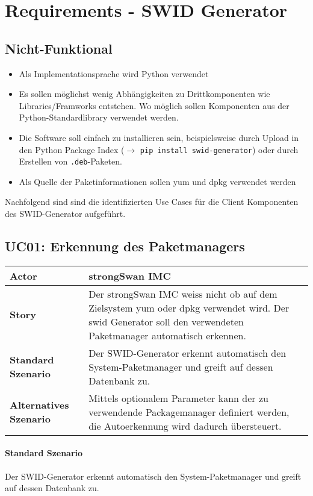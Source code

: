 \section{Requirements - SWID Generator}

\subsection{Nicht-Funktional}

\begin{itemize}
    \item Als Implementationsprache wird Python verwendet
    \item Es sollen möglichst wenig Abhängigkeiten zu Drittkomponenten wie
			Libraries/Framworks entstehen. Wo möglich sollen Komponenten aus der
			Python-Standardlibrary verwendet werden.
    \item Die Software soll einfach zu installieren sein, beispielsweise durch
			Upload in den Python Package Index ($\rightarrow$ \texttt{pip install
			swid-generator}) oder durch Erstellen von \texttt{.deb}-Paketen.
    \item Als Quelle der Paketinformationen sollen yum und dpkg verwendet werden
\end{itemize}

Nachfolgend sind sind die identifizierten Use Cases für die Client Komponenten des SWID-Generator aufgeführt.

\subsection{UC01: Erkennung des Paketmanagers}
\begin{tabularx}{\textwidth}{lX}
\hline 
\textbf{Actor} & strongSwan IMC \\ 
\hline
\textbf{Story} &
Der strongSwan IMC weiss nicht ob auf dem Zielsystem yum oder dpkg verwendet wird. Der swid Generator soll den verwendeten Paketmanager automatisch erkennen. \\
\hline 
\textbf{Standard Szenario} & 
Der SWID-Generator erkennt automatisch den System-Paketmanager und greift auf
dessen Datenbank zu. \\ 
\hline 
\textbf{Alternatives Szenario} &
Mittels optionalem Parameter kann der zu verwendende Packagemanager definiert
werden, die Autoerkennung wird dadurch übersteuert.
\end{tabularx} 



\paragraph{Standard Szenario}
Der SWID-Generator erkennt automatisch den System-Paketmanager und greift auf
dessen Datenbank zu.

